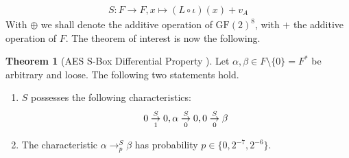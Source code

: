\documentclass[10pt]{amsart}
\theoremstyle{definition}
\newtheorem{theorem}{Theorem}
\theoremstyle{remark}
\begin{document}
    \begin{align}
        S\colon F \to F, x \mapsto (L \circ \iota)(x)+v_A
    \end{align}
    With \(\oplus\) we shall denote the additive operation of \(\text{GF}(2)^8\), with \(+\) the additive operation of \(F\). The theorem of interest is now the following.
    \begin{theorem}[{AES S-Box Differential Property \cite[pp. 62-63]{Bonnetain_2019}}]
        Let \(\alpha, \beta \in F \setminus \{0\} = F^*\) be arbitrary and loose. The following two statements hold.
        \begin{enumerate}[label=(\roman*), wide] \label{thm:aes_s_box_differential_property}
            \item \label{thm:aes_s_box_differential_property_1} \(S\) possesses the following characteristics:
            \begin{align}
                0 \overunderset{S}{1}{\to} 0, \alpha \overunderset{S}{0}{\to} 0, 0 \overunderset{S}{0}{\to} \beta
            \end{align}
            \item \label{thm:aes_s_box_differential_property_2} The characteristic \(\alpha \to_p^S \beta\) has probability \(p \in \{0, 2^{-7}, 2^{-6}\}\).
        \end{enumerate}
    \end{theorem}
\end{document}
